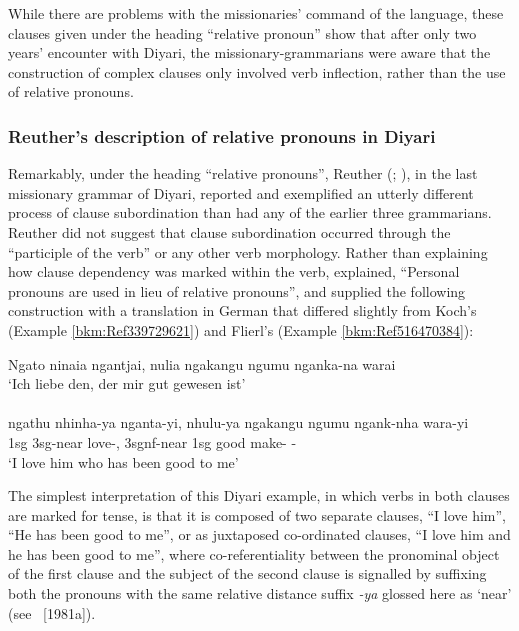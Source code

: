 While there are problems with the missionaries' command of the language, these clauses given under the heading “relative pronoun” show that after only two years' encounter with Diyari, the missionary-grammarians were aware that the construction of complex clauses only involved verb inflection, rather than the use of relative pronouns.

\subsubsection{Reuther’s description of relative pronouns in Diyari \citeyearpar{reuther_dieri_1894}}
\label{sec:key:8.7.3.4}\label{bkm:Ref74838296}\label{bkm:Ref339792843}\label{bkm:Ref339785105}

Remarkably, under the heading “relative pronouns”, Reuther (\citeyear[29]{reuther_dieri_1894}; \citeyear[17--18]{reuther_repr_1899}), in the last missionary grammar of Diyari, reported and exemplified an utterly different process of clause subordination than had any of the earlier three grammarians. Reuther did not suggest that clause subordination occurred through the “participle of the verb” or any other verb morphology. Rather than explaining how clause dependency was marked within the verb, \citet[29]{reuther_dieri_1894} explained, “Personal pronouns are used in lieu of relative pronouns”, and supplied the following construction with a translation in German that differed slightly from Koch’s (Example \ref{bkm:Ref339729621}) and Flierl’s (Example \ref{bkm:Ref516470384}):

\ea        Ngato     ninaia                  ngantjai,      nulia                   ngakangu   ngumu          nganka-na  warai\\
\glt `Ich liebe den, der mir gut gewesen ist' \\
\citep[29]{reuther_dieri_1894}\\
\gll ngathu    nhinha-ya           nganta-yi,   nhulu-ya              ngakangu  ngumu         ngank-nha  wara-yi\\
1sg      3sg-near           love-,      3sgnf-near         1sg         good                make- -\\
\glt `I love him who has been good to me'
\z

The simplest interpretation of this Diyari example, in which verbs in both clauses are marked for tense, is that it is composed of two separate clauses, “I love him'', “He has been good to me'', or as juxtaposed co-ordinated clauses, “I love him and he has been good to me'', where co-referentiality between the pronominal object of the first clause and the subject of the second clause is signalled by suffixing both the pronouns with the same relative distance suffix \textit{-ya} glossed here as `near' (see \citealt{austin_grammar_2013}~[1981a]).

